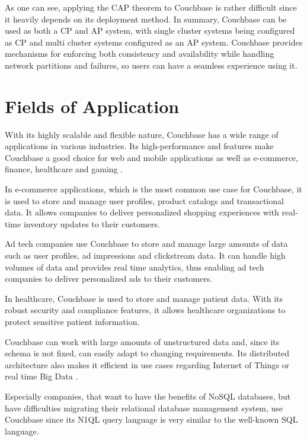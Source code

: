 As one can see, applying the \ac{CAP} theorem to Couchbase is rather difficult since it heavily depends on its deployment method. In summary, Couchbase can be used as both a \ac{CP} and \ac{AP} system, with single cluster systems being configured as \ac{CP} and multi cluster systems configured as an \ac{AP} system. Couchbase provides mechanisms for enforcing both consistency and availability while handling network partitions and failures, so users can have a seamless experience using it.

\section{Fields of Application}

With its highly scalable and flexible nature, Couchbase has a wide range of applications in various industries. Its high-performance and features make Couchbase a good choice for web and mobile applications as well as e-commerce, finance, healthcare and gaming \parencite{Couchbase.20230329}.

In e-commerce applications, which is the most common use case for Couchbase, it is used to store and manage user profiles, product catalogs and transactional data. It allows companies to deliver personalized shopping experiences with real-time inventory updates to their customers.

Ad tech companies use Couchbase to store and manage large amounts of data such as user profiles, ad impressions and clickstream data. It can handle high volumes of data and provides real time analytics, thus enabling ad tech companies to deliver personalized ads to their customers.

In healthcare, Couchbase is used to store and manage patient data. With its robust security and compliance features, it allows healthcare organizations to protect sensitive patient information.
 
Couchbase can work with large amounts of unstructured data and, since its schema is not fixed, can easily adapt to changing requirements. Its distributed architecture also makes it efficient in use cases regarding Internet of Things or real time Big Data \parencite{StudentCouchbase.}.

Especially companies, that want to have the benefits of \ac{NoSQL} databases, but have difficulties migrating their relational database management system, use Couchbase since its \ac{N1QL} query language is very similar to the well-known \ac{SQL} language.

